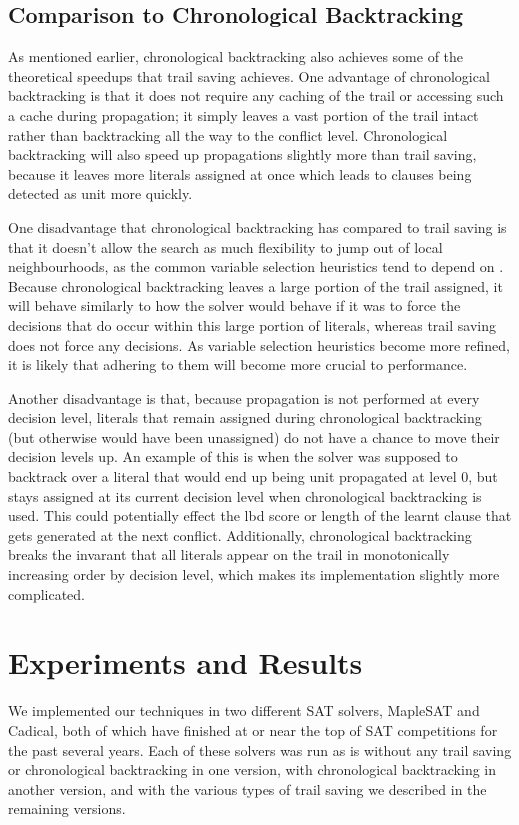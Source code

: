 \documentclass[runningheads]{llncs}
\begin{document}
\subsection{Comparison to Chronological Backtracking}
As mentioned earlier, chronological backtracking also achieves some of
the theoretical speedups that trail saving achieves. One advantage of
chronological backtracking is that it does not require any caching of
the trail or accessing such a cache during propagation; it simply
leaves a vast portion of the trail intact rather than backtracking all
the way to the conflict level. Chronological backtracking will also
speed up propagations slightly more than trail saving, because it
leaves more literals assigned at once which leads to clauses being
detected as unit more quickly.

One disadvantage that chronological backtracking has compared to trail
saving is that it doesn't allow the search as much flexibility to jump
out of local neighbourhoods, as the common variable selection
heuristics tend to depend on
\cite{DBLP:conf/dac/MoskewiczMZZM01,DBLP:conf/sat/2015,DBLP:conf/sat/LiangGPC16}. Because
chronological backtracking leaves a large portion of the trail
assigned, it will behave similarly to how the solver would behave if
it was to force the decisions that do occur within this large portion
of literals, whereas trail saving does not force any decisions. As
variable selection heuristics become more refined, it is likely that
adhering to them will become more crucial to performance.

Another disadvantage is that, because propagation is not performed at
every decision level, literals that remain assigned during
chronological backtracking (but otherwise would have been unassigned)
do not have a chance to move their decision levels up. An example of
this is when the solver was supposed to backtrack over a literal that
would end up being unit propagated at level 0, but stays assigned at
its current decision level when chronological backtracking is
used. This could potentially effect the lbd score or length of the
learnt clause that gets generated at the next conflict. Additionally,
chronological backtracking breaks the invarant that all literals
appear on the trail in monotonically increasing order by decision
level, which makes its implementation slightly more complicated.

\section{Experiments and Results}
We implemented our techniques in two different SAT solvers, MapleSAT
and Cadical, both of which have finished at or near the top of SAT
competitions for the past several years. Each of these solvers was run
as is without any trail saving or chronological backtracking in one
version, with chronological backtracking in another version, and with
the various types of trail saving we described in the remaining
versions.
\end{document}

